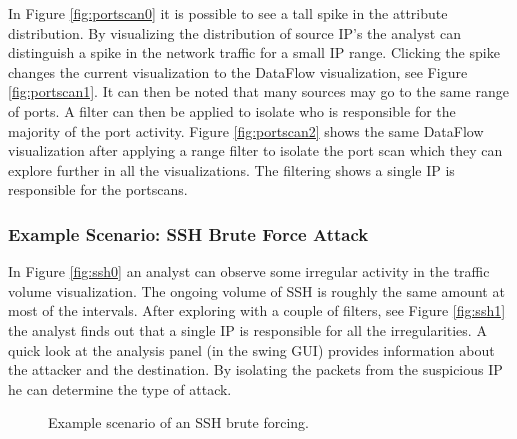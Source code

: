 In Figure \ref{fig:portscan0} it is possible to see a tall spike in the attribute distribution. By
visualizing the distribution of source IP's the analyst can distinguish a spike in the network
traffic for a small IP range. Clicking the spike changes the current visualization to the DataFlow
visualization, see Figure \ref{fig:portscan1}. It can then be noted that many sources may go to the
same range of ports. A filter can then be applied to isolate who is responsible for the majority
of the port activity. Figure \ref{fig:portscan2} shows the same DataFlow visualization after
applying a range filter to isolate the port scan which they can explore further in all the
visualizations. The filtering shows a single IP is responsible for the portscans.

\subsubsection{Example Scenario: SSH Brute Force Attack}
In Figure \ref{fig:ssh0} an analyst can observe some irregular activity in the traffic volume
visualization. The ongoing volume of SSH is roughly the same amount at most of the intervals. After
exploring with a couple of filters, see Figure \ref{fig:ssh1} the analyst finds out that a single IP
is responsible for all the irregularities. A quick look at the analysis panel (in the swing GUI)
provides information about the attacker and the destination. By isolating the packets from the
suspicious IP he can determine the type of attack. 

\begin{figure}[htb]
	\centering
	\caption{\label{fig:ssh} Example scenario of an SSH brute forcing.}
\end{figure}


